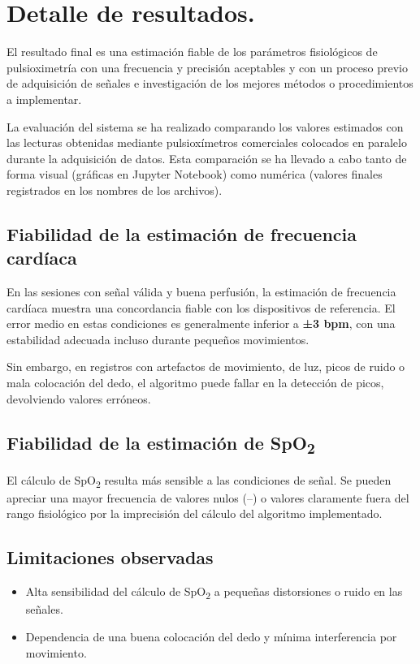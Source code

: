 \section{Detalle de resultados.}

El resultado final es una estimación fiable de los parámetros fisiológicos de pulsioximetría con una frecuencia y precisión aceptables y con un proceso previo de adquisición de señales e investigación de los mejores métodos o procedimientos a implementar.

La evaluación del sistema se ha realizado comparando los valores estimados con las lecturas obtenidas mediante pulsioxímetros comerciales colocados en paralelo durante la adquisición de datos. Esta comparación se ha llevado a cabo tanto de forma visual (gráficas en Jupyter Notebook) como numérica (valores finales registrados en los nombres de los archivos).

\subsection{Fiabilidad de la estimación de frecuencia cardíaca}

En las sesiones con señal válida y buena perfusión, la estimación de frecuencia cardíaca muestra una concordancia fiable con los dispositivos de referencia. El error medio en estas condiciones es generalmente inferior a \textbf{±3 bpm}, con una estabilidad adecuada incluso durante pequeños movimientos. 

Sin embargo, en registros con artefactos de movimiento, de luz, picos de ruido o mala colocación del dedo, el algoritmo puede fallar en la detección de picos, devolviendo valores erróneos.

\subsection{Fiabilidad de la estimación de SpO\textsubscript{2}}

El cálculo de SpO\textsubscript{2} resulta más sensible a las condiciones de señal. Se pueden apreciar una mayor frecuencia de valores nulos (--) o valores claramente fuera del rango fisiológico por la imprecisión del cálculo del algoritmo implementado.

\subsection{Limitaciones observadas}

\begin{itemize}
    \item Alta sensibilidad del cálculo de SpO\textsubscript{2} a pequeñas distorsiones o ruido en las señales.
    \item Dependencia de una buena colocación del dedo y mínima interferencia por movimiento.
\end{itemize}

